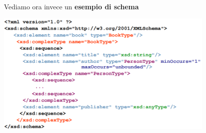 \documentclass[12pt]{article}
\begin{document}
Vediamo ora invece un \textbf{esempio di schema}
\begin{center}
    \includegraphics[width = 0.80\textwidth]{Images/151.PNG}
\end{center}
\end{document}
